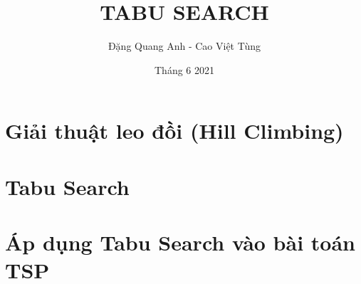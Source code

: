 \documentclass[12pt]{beamer}
\begin{document}
	\author{Đặng Quang Anh - Cao Việt Tùng}
	\title{TABU SEARCH}
	\date{Tháng 6 2021}
	\maketitle
	\begin{abstract}
		
	\end{abstract}
	

	\section{Giải thuật leo đồi (Hill Climbing)}
	
	\section{Tabu Search}
	
	\section{Áp dụng Tabu Search vào bài toán TSP}
\end{document}
